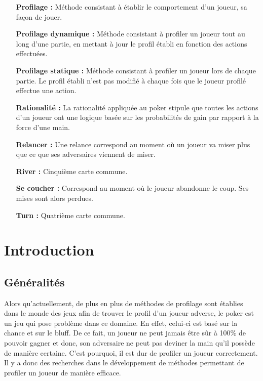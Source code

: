 \documentclass{report}
\begin{document}
\begin{itemize}
		\item[\textbf{Profilage : }]	Méthode consistant à établir le comportement d'un joueur, sa façon de jouer.
		
		\item[\textbf{Profilage dynamique : }]Méthode consistant à profiler un joueur tout au long d'une partie, en mettant à jour le profil établi en fonction des actions effectuées.\medskip
		
		\item[\textbf{Profilage statique : }]Méthode consistant à profiler un joueur lors de chaque partie. Le profil établi n'est pas modifié à chaque fois que le joueur profilé effectue une action.\medskip

		\item[\textbf{Rationalité : }]La rationalité  appliquée au poker stipule que toutes les actions d'un joueur ont une logique basée sur les probabilités de gain par rapport à la force d'une main.\medskip

		\item[\textbf{Relancer : }]Une relance correspond au moment où un joueur va miser plus que ce que ses adversaires viennent de miser.\medskip
		
		\item[\textbf{River : }]Cinquième carte commune.\medskip
		
		\item[\textbf{Se coucher : }]Correspond au moment où le joueur abandonne le coup. Ses mises sont alors perdues.\medskip

		\item[\textbf{Turn : }]Quatrième carte commune.\medskip
		
		
		

		
\end{itemize}



\chapter{Introduction}

\section{Généralités}
\hspace{0.5cm}Alors qu'actuellement, de plus en plus de méthodes de profilage sont établies dans le monde des jeux afin de trouver le profil d'un joueur adverse, le poker est un jeu qui pose problème dans ce domaine. En effet, celui-ci est basé sur la chance et sur le bluff. De ce fait, un joueur ne peut jamais être sûr à 100\% de pouvoir gagner et donc, son adversaire ne peut pas deviner la main qu'il possède de manière certaine. C'est pourquoi, il est dur de profiler un joueur correctement. Il y a donc des recherches dans le développement de méthodes permettant de profiler un joueur de manière efficace. \par
\end{document}
